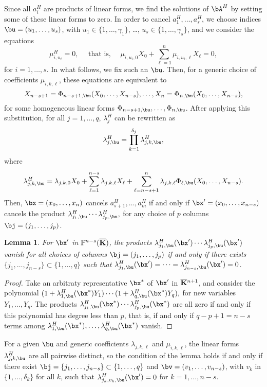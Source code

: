 \documentclass[12pt]{article}
\newtheorem{lemma}[definition]{Lemma}
\begin{document}
Since all $a_i^H$ are products of linear forms, we find the solutions
of $\bA^H$ by setting some of these linear forms to zero. In order to
cancel $a_1^H,\dots,a_s^H$, we choose indices $\bu=(u_1,\dots,u_s)$,
with $u_1\in\{1,\dots,\gamma_1\}$, \dots,
$u_s\in\{1,\dots,\gamma_s\}$, and we consider the equations 
$$\mu^H_{i,u_i}=0, \quad \text{~that is,~} \quad \mu_{i,u_i,0}X_0 + \sum_{\ell = 1}^{n}\mu_{i,u_i,\ell}X_\ell =0,$$ for $i=1,\dots,s$.
In what follows, we fix such an $\bu$.
Then, for a generic choice of coefficients $\mu_{i,k,\ell}$, these equations
are equivalent to
$$X_{n-s+1}=\Phi_{n-s+1,\bu}(X_0,\dots,X_{n-s}),\dots,X_{n}=\Phi_{n,\bu}(X_0,\dots,X_{n-s}),$$
for some homogeneous linear forms
$\Phi_{n-s+1,\bu},\dots,\Phi_{n,\bu}$.  After applying this
substitution, for all $j=1,\dots,q$, $\lambda^H_j$ can be rewritten as
$$\lambda^H_{j,\bu}=\prod_{k=1}^{\delta_j}\lambda^H_{j,k,\bu},$$
where 
$$\lambda^H_{j,k,\bu}=\lambda_{j,k,0}X_0 + \sum_{\ell =
  1}^{n-s}\lambda_{j,k,\ell}X_\ell + \sum_{\ell =
  n-s+1}^{n}\lambda_{j,k,\ell}
\Phi_{\ell,\bu}(X_0,\dots,X_{n-s}).$$ Then,
$\bx=(x_0,\dots,x_n)$ cancels $a^H_{s+1},\dots,a^H_m$ if and only if
$\bx'=(x_0,\dots,x_{n-s})$ cancels the product
$\lambda^H_{j_1,\bu}\cdots \lambda^H_{j_p,\bu},$ for any choice of $p$ columns
$\bj=(j_1,\dots,j_p)$.

\begin{lemma}
  For $\bx'$ in $\mathbb{P}^{n-s}(\overline{\mathbf{K}})$, the products
  $\lambda^H_{j_1,\bu}(\bx')\cdots \lambda^H_{j_p,\bu}(\bx')$
  vanish for all choices of columns $\bj=(j_1,\dots,j_p)$ if and only
  if there exists $\{j_1,\dots,j_{n-s}\} \subset \{1,\dots,q\}$ such 
  that $\lambda^H_{j_1,\bu}(\bx')=\cdots=\lambda^H_{j_{n-s},\bu}(\bx')=0$.
\end{lemma}
\begin{proof}
  Take an arbitraty representative $\bx^*$ of $\bx'$ in
  $\overline{\mathbf{K}}{}^{n+1}$, and consider the polynomial 
  $(1+\lambda^H_{1,\bu}(\bx^*)Y_1) \cdots (1+\lambda^H_{q,\bu}(\bx^*)Y_q),$
  for new variables $Y_1,\dots,Y_q$. The products
  $\lambda^H_{j_1,\bu}(\bx^*)\cdots \lambda^H_{j_p,\bu}(\bx^*)$ are all zero
  if and only if this polynomial has degree less than $p$, that is, if
  and only if $q-p+1=n-s$ terms among
  $\lambda^H_{1,\bu}(\bx^*),\dots,\lambda^H_{q,\bu}(\bx^*)$ vanish.
\end{proof}


For a given $\bu$ and generic coefficients $\lambda_{j,k,\ell}$ and $\mu_{i,k,\ell}$,
 the linear forms $\lambda^H_{j,k,\bu}$ are all pairwise distinct, so
the condition of the lemma holds if and only if there exist
$\bj=\{j_1,\dots,j_{n-s}\} \subset \{1,\dots,q\}$ and
$\bv=(v_1,\dots,v_{n-s})$, with $v_k$ in $\{1,\dots,\delta_k\}$ for all
$k$, such that $\lambda^H_{j_k,v_k,\bu}(\bx')=0$ 
for $k=1,\dots,n-s$.
\end{document}
